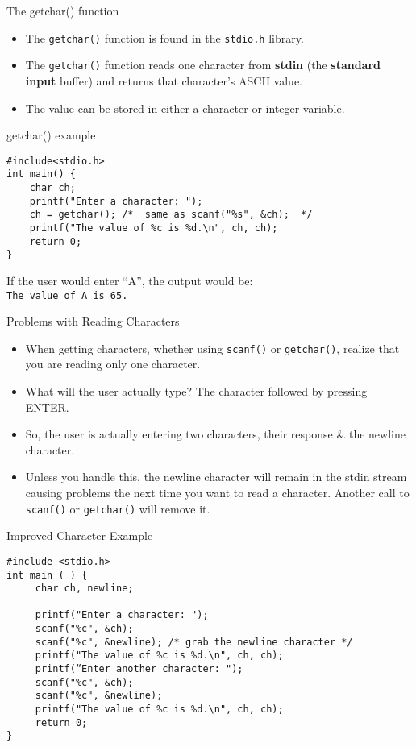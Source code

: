 \documentclass[graphics]{beamer}
\begin{document}
\begin{frame}{The getchar() function}
    \begin{itemize}
        \item The \texttt{getchar()} function is found in the \texttt{stdio.h} library.
        \item The \texttt{getchar()} function reads one character from \textbf{stdin} (the \textbf{standard input} buffer) and returns that character's ASCII value.
        \item The value can be stored in either a character or integer variable.
    \end{itemize}
\end{frame}

\begin{frame}[fragile]{getchar() example}
    \begin{verbatim}
#include<stdio.h>
int main() {
    char ch;
    printf("Enter a character: ");
    ch = getchar(); /*  same as scanf("%s", &ch);  */
    printf("The value of %c is %d.\n", ch, ch);
    return 0;
}
    \end{verbatim}
    If the user would enter ``A'', the output would be: \\
    \texttt{The value of A is 65.}
\end{frame}

\begin{frame}{Problems with Reading Characters}
    \begin{itemize}
        \item When getting characters, whether using \texttt{scanf()} or \texttt{getchar()}, realize that you are reading only one character.
        \item What will the user actually type? The character followed by pressing ENTER.
        \item So, the user is actually entering two characters, their response \& the newline character.
        \item Unless you handle this, the newline character will remain in the stdin stream causing problems the next time you want to read a character.  Another call to \texttt{scanf()} or \texttt{getchar()} will remove it.
    \end{itemize}
\end{frame}

\begin{frame}[fragile]{Improved Character Example}
    \begin{verbatim}
#include <stdio.h>
int main ( ) {
     char ch, newline;

     printf("Enter a character: ");
     scanf("%c", &ch);
     scanf("%c", &newline); /* grab the newline character */
     printf("The value of %c is %d.\n", ch, ch);
     printf(“Enter another character: ");
     scanf("%c", &ch);
     scanf("%c", &newline); 
     printf("The value of %c is %d.\n", ch, ch);
     return 0;
}
    \end{verbatim}
\end{frame}
\end{document}
